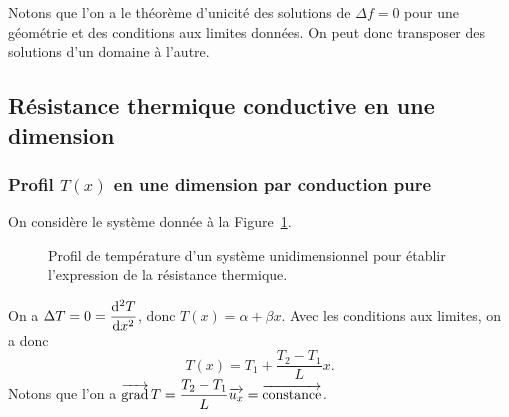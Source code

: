         Notons que l'on a le théorème d'unicité des solutions de $\Delta f=0$ pour une géométrie et des conditions aux limites données. On peut donc transposer des solutions d'un domaine à l'autre.

    \subsection{Résistance thermique conductive en une dimension}
        \subsubsection{Profil $T(x)$ en une dimension par conduction pure}

            On considère le système donnée à la Figure~\ref{fig:resistance_thermique_conductive_1d}.
            \begin{figure}
                \centering
                \caption{Profil de température d'un système unidimensionnel pour établir l'expression de la résistance thermique.}    
                \label{fig:resistance_thermique_conductive_1d}
            \end{figure}

            On a $\Delta T=0=\dfrac{\mathrm{d}^{2}T}{\mathrm{d} x^{2}}$, donc $T(x)=\alpha+\beta x$. Avec les conditions aux limites, on a donc
            \begin{equation}
                T(x)=T_1+\frac{T_2-T_1}{L}x.
            \end{equation}
            Notons que l'on a $\operatorname{\overrightarrow{\text{grad}}} T=\dfrac{T_2-T_1}{L}\protect\overrightarrow{{u_x}}=\protect\overrightarrow{{\mathrm{constance}}}$.

